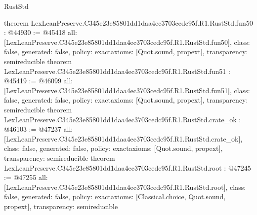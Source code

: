 \begin{lexlean}{RustStd}
\begin{coremodule}
{}
theorem LexLeanPreserve.C345e23e85801dd1daa4ec3703cedc95f.R1.RustStd.fun50 : @44930 := @45418 {
  all: [LexLeanPreserve.C345e23e85801dd1daa4ec3703cedc95f.R1.RustStd.fun50],
  class: false,
  generated: false,
  policy: exact{axioms: [Quot.sound, propext]},
  transparency: semireducible
}
theorem LexLeanPreserve.C345e23e85801dd1daa4ec3703cedc95f.R1.RustStd.fun51 : @45419 := @46099 {
  all: [LexLeanPreserve.C345e23e85801dd1daa4ec3703cedc95f.R1.RustStd.fun51],
  class: false,
  generated: false,
  policy: exact{axioms: [Quot.sound, propext]},
  transparency: semireducible
}
theorem LexLeanPreserve.C345e23e85801dd1daa4ec3703cedc95f.R1.RustStd.crate_ok : @46103 := @47237 {
  all: [LexLeanPreserve.C345e23e85801dd1daa4ec3703cedc95f.R1.RustStd.crate_ok],
  class: false,
  generated: false,
  policy: exact{axioms: [Quot.sound, propext]},
  transparency: semireducible
}
theorem LexLeanPreserve.C345e23e85801dd1daa4ec3703cedc95f.R1.RustStd.root : @47245 := @47255 {
  all: [LexLeanPreserve.C345e23e85801dd1daa4ec3703cedc95f.R1.RustStd.root],
  class: false,
  generated: false,
  policy: exact{axioms: [Classical.choice, Quot.sound, propext]},
  transparency: semireducible
}


\end{coremodule}
\end{lexlean}
